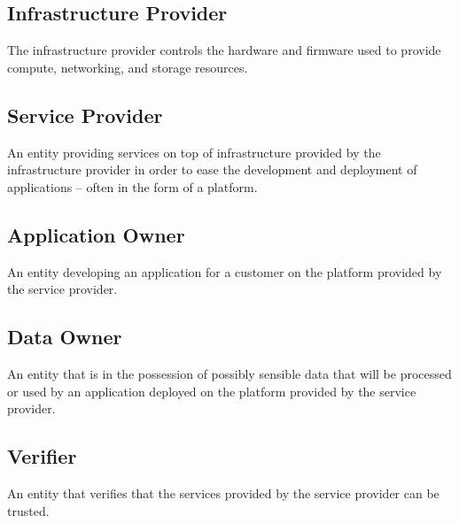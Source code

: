 
\subsection*{Infrastructure Provider}

The infrastructure provider controls the hardware and firmware used to provide
compute, networking, and storage resources.

\subsection*{Service Provider}

An entity providing services on top of infrastructure provided by the
infrastructure provider in order to ease the development and deployment of
applications -- often in the form of a platform.

\subsection*{Application Owner}

An entity developing an application for a customer on the platform provided by
the service provider.

\subsection*{Data Owner}

An entity that is in the possession of possibly sensible data that will be
processed or used by an application deployed on the platform provided by the
service provider.

\subsection*{Verifier}

An entity that verifies that the services provided by the service provider can
be trusted.
